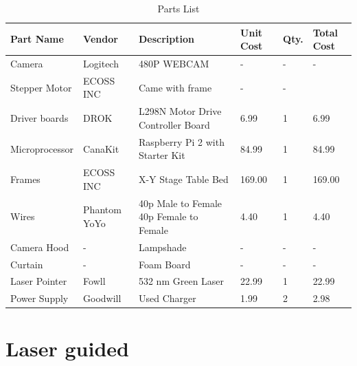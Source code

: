 \documentclass[letterpaper,12pt,oneside]{book}
\begin{document}
		\begin{table}[ht!]
			\begin{center}	
				\begin{tabular}{|l|p{1.5cm}|p{4cm}|l|l|l|}
					\hline
					Part Name & Vendor & Description  & Unit Cost & Qty. & Total Cost \\ \hline
					Camera & Logitech & 480P WEBCAM & - & - & -\\ 
					\hline
					Stepper Motor & ECOSS INC & Came with frame & - & - &\\ 
					\hline
					Driver boards & DROK & L298N Motor Drive Controller Board & 6.99 & 1 & 6.99\\
					\hline
					Microprocessor & CanaKit & Raspberry Pi 2 with Starter Kit & 84.99 & 1 & 84.99\\
					\hline
					Frames & ECOSS INC & X-Y Stage Table Bed &  169.00 & 1 & 169.00\\
					\hline
					Wires & Phantom YoYo & 40p Male to Female 40p Female to Female & 4.40 & 1 & 4.40\\
					\hline
					Camera Hood & - & Lampshade & - & - & -\\
					\hline
					Curtain & - & Foam Board & - & - & -\\
					\hline
					Laser Pointer & Fowll & 532 nm Green Laser & 22.99 & 1 & 22.99\\
					\hline
					Power Supply & Goodwill & Used Charger & 1.99 & 2 & 2.98\\
					\hline
				\end{tabular}
				\caption{Parts List}
			\end{center}
		\end{table}
		
		
		\section{Laser guided}
		
\end{document}
